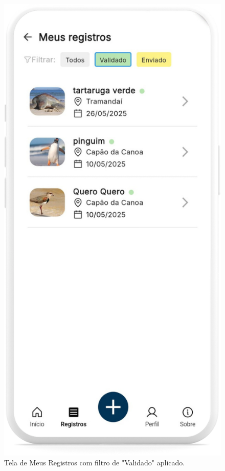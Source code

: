 \begin{figure}[H]
\begin{minipage}[t]{0.48\textwidth}
        \includegraphics[height=0.72\textheight]{imagens/sistema/device_frame/meusregistrosValidado.png}
        \caption{Tela de Meus Registros com filtro de "Validado" aplicado.}
        \label{fig:meus-registros-validado}

\end{minipage}
\end{figure}
